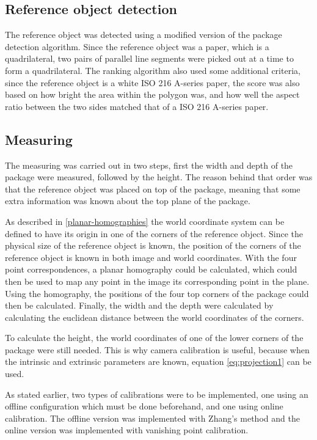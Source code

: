 \subsection{Reference object detection} \label{method:reference_object_detection}
The reference object was detected using a modified version of the package detection algorithm.
Since the reference object was a paper, which is a quadrilateral, two pairs of parallel line segments were picked out at a time to form a quadrilateral.
The ranking algorithm also used some additional criteria, since the reference object is a white ISO 216 A-series  paper, the score was also based on how bright the area within the polygon was, and how well the aspect ratio between the two sides matched that of a ISO 216 A-series paper.

\subsection{Measuring} \label{method:measuring} %
The measuring was carried out in two steps, first the width and depth of the package were measured, followed by the height. 
The reason behind that order was that the reference object was placed on top of the package, meaning that some extra information was known about the  top plane of the package.

As described in \ref{planar-homographies} the world coordinate system can be defined to have its origin in one of the corners of the reference object.
Since the physical size of the reference object is known, the position of the corners of the reference object is known in both image and world coordinates.
With the four point correspondences, a planar homography could be calculated, which could then be used to map any point in the image its corresponding point in the plane.
Using the homography, the positions of the four top corners of the package could then be calculated. 
Finally, the width and the depth were calculated by calculating the euclidean distance between the world coordinates of the corners.

To calculate the height, the world coordinates of one of the lower corners of the package were still needed.
This is why camera calibration is useful, because when the intrinsic and extrinsic parameters are known, equation \ref{eq:projection1} can be used.

As stated earlier, two types of calibrations were to be implemented, one using an offline configuration which must be done beforehand, and one using online calibration.
The offline version was implemented with Zhang's method and the online version was implemented with vanishing point calibration.

